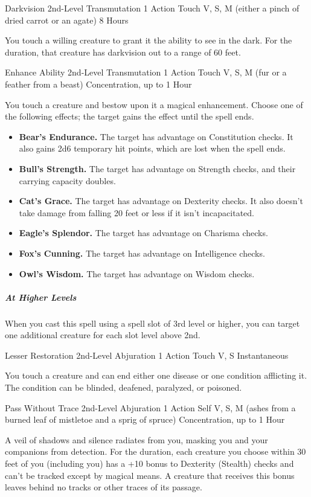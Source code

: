 {\DndSpellHeader
  {Darkvision}
  {2nd-Level Transmutation}
  {1 Action}
  {Touch}
  {V, S, M (either a pinch of dried carrot or an agate)}
  {8 Hours}

You touch a willing creature to grant it the ability to see in the dark. For the duration, that creature has darkvision out to a range of 60 feet.

\DndSpellHeader
  {Enhance Ability}
  {2nd-Level Transmutation}
  {1 Action}
  {Touch}
  {V, S, M (fur or a feather from a beast)}
  {Concentration, up to 1 Hour}

You touch a creature and bestow upon it a magical enhancement. Choose one of the following effects; the target gains the effect until the spell ends.
\begin{itemize}
	\item \textbf{Bear’s Endurance.} The target has advantage on Constitution checks. It also gains 2d6 temporary hit points, which are lost when the spell ends.
	\item \textbf{Bull’s Strength.} The target has advantage on Strength checks, and their carrying capacity doubles.
	\item \textbf{Cat’s Grace.} The target has advantage on Dexterity checks. It also doesn’t take damage from falling 20 feet or less if it isn’t incapacitated.
	\item \textbf{Eagle’s Splendor.} The target has advantage on Charisma checks.
	\item \textbf{Fox’s Cunning.} The target has advantage on Intelligence checks.
	\item \textbf{Owl’s Wisdom.} The target has advantage on Wisdom checks.
\end{itemize}

\subparagraph*{At Higher Levels} When you cast this spell using a spell slot of 3rd level or higher, you can target one additional creature for each slot level above 2nd.

\DndSpellHeader
  {Lesser Restoration}
  {2nd-Level Abjuration}
  {1 Action}
  {Touch}
  {V, S}
  {Instantaneous}

You touch a creature and can end either one disease or one condition afflicting it. The condition can be blinded, deafened, paralyzed, or poisoned.

\DndSpellHeader
  {Pass Without Trace}
  {2nd-Level Abjuration}
  {1 Action}
  {Self}
  {V, S, M (ashes from a burned leaf of mistletoe and a sprig of spruce)}
  {Concentration, up to 1 Hour}

A veil of shadows and silence radiates from you, masking you and your companions from detection. For the duration, each creature you choose within 30 feet of you (including you) has a +10 bonus to Dexterity (Stealth) checks and can’t be tracked except by magical means. A creature that receives this bonus leaves behind no tracks or other traces of its passage.

}
